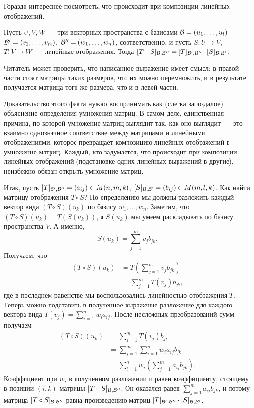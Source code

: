 Гораздо интереснее посмотреть, что
происходит при композиции линейных отображений.
\begin{theorem}\label{thm:composition-is-multiplication}
Пусть $U,V,W$~--- три векторных пространства с базисами
$\mathcal B = (u_1,\dots,u_l)$,
$\mathcal B' = (v_1,\dots,v_m)$,
$\mathcal B'' = (w_1,\dots,w_n)$, соответственно,
и пусть $S\colon U\to V$, $T\colon V\to W$~--- линейные отображения.
Тогда
$[T\circ S]_{\mathcal B,\mathcal B''} = [T]_{\mathcal B',\mathcal B''}\cdot
[S]_{\mathcal B,\mathcal B'}$.
\end{theorem}
Читатель может проверить, что написанное выражение имеет смысл:
в правой части стоят матрицы таких размеров, что их можно
перемножить, и в результате получается матрица того же размера,
что и в левой части.

Доказательство этого факта нужно воспринимать как
(слегка запоздалое) объяснение определения умножения матриц.
В самом деле, единственная причина, по которой умножение
матриц выглядит так, как оно выглядит~--- это взаимно
однозначное соответствие между матрицами и линейными отображениями,
которое превращает композицию линейных отображений
в умножение матриц. Каждый, кто задумается, что происходит
при композиции линейных отображений (подстановке одних линейных
выражений в другие), неизбежно обязан открыть умножение матриц.

Итак, пусть $[T]_{\mathcal B',\mathcal B''} = (a_{ij}) \in M(n,m,k)$,
$[S]_{\mathcal B,\mathcal B'} = (b_{ij}) \in M(m,l,k)$.
Как найти матрицу отображения $T\circ S$?
По определению мы должны разложить каждый вектор
вида $(T\circ S)(u_k)$ по базису $w_1,\dots,w_n$.
Заметим, что  $(T\circ S)(u_k) = T(S(u_k))$,
а $S(u_k)$ мы умеем раскладывать по базису пространства $V$.
А именно,
$$
S(u_k) = \sum_{j=1}^m v_jb_{jk}.
$$
Получаем, что
\begin{align*}
(T\circ S)(u_k) &= T\left(\sum_{j=1}^m v_jb_{jk}\right)\\
&= \sum_{j=1}^m T(v_j)b_{jk},
\end{align*}
где в последнем равенстве мы воспользовались линейностью
отображения $T$. Теперь можно подставить в полученное
выражение разложение для каждого вектора вида
$T(v_j) = \sum_{i=1}^n w_i a_{ij}$.
После несложных преобразований сумм получаем
\begin{align*}
(T\circ S)(u_k) &=  \sum_{j=1}^m T(v_j)b_{ji} \\
&= \sum_{j=1}^m \sum_{i=1}^n w_i a_{ij} b_{jk} \\
&= \sum_{i=1}^n w_i\left( \sum_{j=1}^m a_{ij}b_{jk}\right).
\end{align*}
Коэффициент при $w_i$ в полученном разложении и равен
коэффициенту, стоящему в позиции $(i,k)$ матрицы
$[T\circ S]_{\mathcal B,\mathcal B''}$.
Он оказался равен $\sum_{j=1}^m a_{ij}b_{jk}$,
и потому матрица $[T\circ S]_{\mathcal B,\mathcal B''}$ равна
произведению матриц
$[T]_{\mathcal B',\mathcal B''}\cdot [S]_{\mathcal B,\mathcal B'}$.

